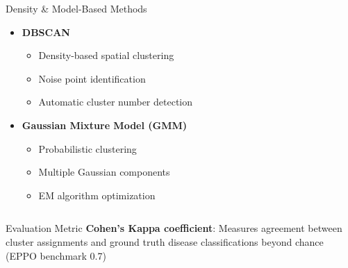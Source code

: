 \documentclass[aspectratio=43]{beamer}
\begin{document}
\begin{frame}
\begin{columns}
        \begin{column}{0.5\textwidth}
            \begin{block}{Density & Model-Based Methods}
                \begin{itemize}
                    \item \textbf{DBSCAN}
                        \begin{itemize}
                            \tiny
                            \item Density-based spatial clustering
                            \item Noise point identification
                            \item Automatic cluster number detection
                        \end{itemize}
                    \item \textbf{Gaussian Mixture Model (GMM)}
                        \begin{itemize}
                            \tiny
                            \item Probabilistic clustering
                            \item Multiple Gaussian components
                            \item EM algorithm optimization
                        \end{itemize}
                \end{itemize}
            \end{block}
        \end{column}
    \end{columns}
            
    \begin{alertblock}{Evaluation Metric}
        \scriptsize
        \textbf{Cohen's Kappa coefficient}: Measures agreement between cluster assignments and ground truth disease classifications beyond chance (EPPO benchmark 0.7)
    \end{alertblock}
\end{frame}
\end{document}
